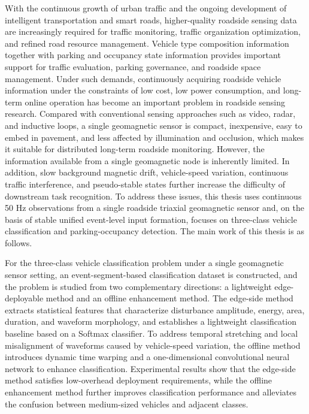 
With the continuous growth of urban traffic and the ongoing development of intelligent transportation and smart roads, higher-quality roadside sensing data are increasingly required for traffic monitoring, traffic organization optimization, and refined road resource management. Vehicle type composition information together with parking and occupancy state information provides important support for traffic evaluation, parking governance, and roadside space management. Under such demands, continuously acquiring roadside vehicle information under the constraints of low cost, low power consumption, and long-term online operation has become an important problem in roadside sensing research. Compared with conventional sensing approaches such as video, radar, and inductive loops, a single geomagnetic sensor is compact, inexpensive, easy to embed in pavement, and less affected by illumination and occlusion, which makes it suitable for distributed long-term roadside monitoring. However, the information available from a single geomagnetic node is inherently limited. In addition, slow background magnetic drift, vehicle-speed variation, continuous traffic interference, and pseudo-stable states further increase the difficulty of downstream task recognition. To address these issues, this thesis uses continuous 50 Hz observations from a single roadside triaxial geomagnetic sensor and, on the basis of stable unified event-level input formation, focuses on three-class vehicle classification and parking-occupancy detection. The main work of this thesis is as follows.

For the three-class vehicle classification problem under a single geomagnetic sensor setting, an event-segment-based classification dataset is constructed, and the problem is studied from two complementary directions: a lightweight edge-deployable method and an offline enhancement method. The edge-side method extracts statistical features that characterize disturbance amplitude, energy, area, duration, and waveform morphology, and establishes a lightweight classification baseline based on a Softmax classifier. To address temporal stretching and local misalignment of waveforms caused by vehicle-speed variation, the offline method introduces dynamic time warping and a one-dimensional convolutional neural network to enhance classification. Experimental results show that the edge-side method satisfies low-overhead deployment requirements, while the offline enhancement method further improves classification performance and alleviates the confusion between medium-sized vehicles and adjacent classes.

